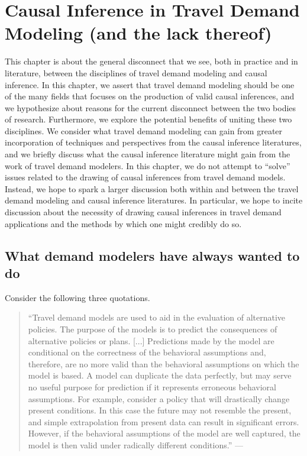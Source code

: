 \chapter[Causal Inference in Travel Demand Modeling]{Causal Inference in Travel Demand Modeling (and the lack thereof)}
\label{ch:causality}

\begin{chapterabstract}
This chapter is about the general disconnect that we see, both in practice and in literature, between the disciplines of travel demand modeling and causal inference. In this chapter, we assert that travel demand modeling should be one of the many fields that focuses on the production of valid causal inferences, and we hypothesize about reasons for the current disconnect between the two bodies of research. Furthermore, we explore the potential benefits of uniting these two disciplines. We consider what travel demand modeling can gain from greater incorporation of techniques and perspectives from the causal inference literatures, and we briefly discuss what the causal inference literature might gain from the work of travel demand modelers. In this chapter, we do not attempt to ``solve'' issues related to the drawing of causal inferences from travel demand models. Instead, we hope to spark a larger discussion both within and between the travel demand modeling and causal inference literatures. In particular, we hope to incite discussion about the necessity of drawing causal inferences in travel demand applications and the methods by which one might credibly do so.
\end{chapterabstract}

\section{What demand modelers have always wanted to do}
\label{sec:travel_demand_goals}
Consider the following three quotations.
\begin{quotation}
``Travel demand models are used to aid in the evaluation of alternative policies. The purpose of the models is to predict the consequences of alternative policies or plans. [...] Predictions made by the model are conditional on the correctness of the behavioral assumptions and, therefore, are no more valid than the behavioral assumptions on which the model is based. A model can duplicate the data perfectly, but may serve no useful purpose for prediction if it represents erroneous behavioral assumptions. For example, consider a policy that will drastically change present conditions. In this case the future may not resemble the present, and simple extrapolation from present data can result in significant errors. However, if the behavioral assumptions of the model are well captured, the model is then valid under radically different conditions.''  ---\citep{ben1973structure}
\end{quotation}

